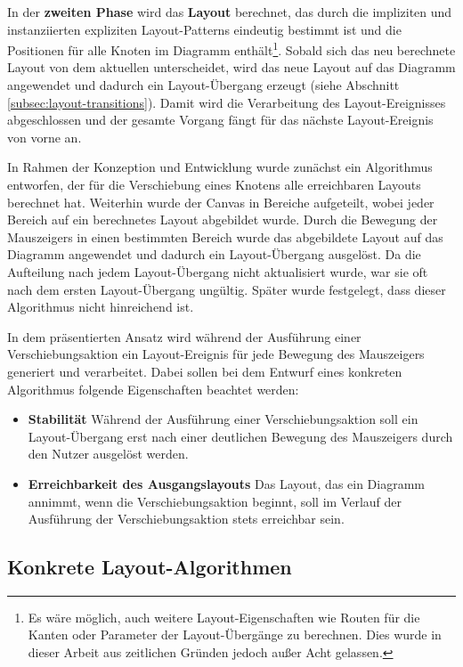In der \textbf{zweiten Phase} wird das \textbf{Layout} berechnet, das durch die impliziten und instanziierten expliziten Layout-Patterns eindeutig bestimmt ist und die Positionen für alle Knoten im Diagramm enthält\footnote{Es wäre möglich, auch weitere Layout-Eigenschaften wie Routen für die Kanten oder Parameter der Layout-Übergänge zu berechnen. Dies wurde in dieser Arbeit aus zeitlichen Gründen jedoch außer Acht gelassen.}. Sobald sich das neu berechnete Layout von dem aktuellen unterscheidet, wird das neue Layout auf das Diagramm angewendet und dadurch ein Layout-Übergang erzeugt (siehe Abschnitt \ref{subsec:layout-transitions}). Damit wird die Verarbeitung des Layout-Ereignisses abgeschlossen und der gesamte Vorgang fängt für das nächste Layout-Ereignis von vorne an.

In Rahmen der Konzeption und Entwicklung wurde zunächst ein Algorithmus entworfen, der für die Verschiebung eines Knotens alle erreichbaren Layouts berechnet hat. Weiterhin wurde der Canvas in Bereiche aufgeteilt, wobei jeder Bereich auf ein berechnetes Layout abgebildet wurde. Durch die Bewegung der Mauszeigers in einen bestimmten Bereich wurde das abgebildete Layout auf das Diagramm angewendet und dadurch ein Layout-Übergang ausgelöst. Da die Aufteilung nach jedem Layout-Übergang nicht aktualisiert wurde, war sie oft nach dem ersten Layout-Übergang ungültig. Später wurde festgelegt, dass dieser Algorithmus nicht hinreichend ist.

In dem präsentierten Ansatz wird während der Ausführung einer Verschiebungsaktion ein Layout-Ereignis für jede Bewegung des Mauszeigers generiert und verarbeitet. Dabei sollen bei dem Entwurf eines konkreten Algorithmus folgende Eigenschaften beachtet werden:

\begin{itemize}

\item
\textbf{Stabilität}
Während der Ausführung einer Verschiebungsaktion soll ein Layout-Übergang erst nach einer deutlichen Bewegung des Mauszeigers durch den Nutzer ausgelöst werden.

\item
\textbf{Erreichbarkeit des Ausgangslayouts}
Das Layout, das ein Diagramm annimmt, wenn die Verschiebungsaktion beginnt, soll im Verlauf der Ausführung der Verschiebungsaktion stets erreichbar sein.

\end{itemize}

\subsection{Konkrete Layout-Algorithmen}
\label{subsec:concrete-layout-algorithms}

